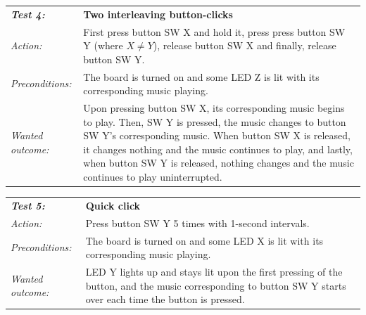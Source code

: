 \documentclass[a4paper,12pt]{article}
\begin{document}
\begin{tabular}[h]{|lp{12cm}|} \hline
\textbf{\emph{Test 4:}} 		& \textbf{Two interleaving button-clicks}\\
\emph{Action:} 		& First press button SW X and hold it, press press button SW Y (where $X \neq Y$), release button SW X and finally, release button SW Y. \\
\emph{Preconditions:}	& The board is turned on and some LED Z is lit with its corresponding music playing.\\
\emph{Wanted outcome:}	& Upon pressing button SW X, its corresponding music begins to play. Then, SW Y is pressed, the music changes to button SW Y's corresponding music. When button SW X is released, it changes nothing and the music continues to play, and lastly, when button SW Y is released, nothing changes and the music continues to play uninterrupted. \\ \hline
\end{tabular}
\vspace{1cm}

\begin{tabular}[h]{|lp{12cm}|} \hline
\textbf{\emph{Test 5:}} 		& \textbf{Quick click}\\
\emph{Action:} 		& Press button SW Y 5 times with 1-second intervals.\\
\emph{Preconditions:}	& The board is turned on and some LED X is lit with its corresponding music playing.\\
\emph{Wanted outcome:}	& LED Y lights up and stays lit upon the first pressing of the button, and the music corresponding to button SW Y starts over each time the button is pressed.\\ \hline
\end{tabular}
\end{document}
